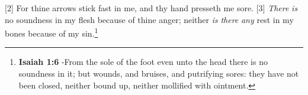 [2] \textcolor[cmyk]{0.99998,1,0,0}{For thine arrows stick fast in me, and thy hand presseth me sore.}
[3] \textcolor[cmyk]{0.99998,1,0,0}{\emph{There} \emph{is} no soundness in my flesh because of thine anger; neither \emph{is} \emph{there} \emph{any} rest in my bones because of my sin.}\footnote{\textbf{Isaiah 1:6} -From the sole of the foot even unto the head there is no soundness in it; but wounds, and bruises, and putrifying sores: they have not been closed, neither bound up, neither mollified with ointment.} %
